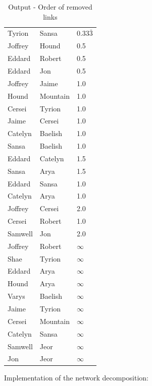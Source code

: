 \documentclass[10pt,a4paper]{article}
\begin{document}
\begin{enumerate}
	\begin{table}[H]
		\centering
		\caption{Output - Order of removed links}
		\label{table_links}
		\begin{tabular}{lll}
			Tyrion  & Sansa    & 0.33$\bar{3}$  \\
			Joffrey & Hound    & 0.5    \\
			Eddard  & Robert   & 0.5                 \\
			Eddard  & Jon      & 0.5                 \\
			Joffrey & Jaime    & 1.0                 \\
			Hound   & Mountain & 1.0                 \\
			Cersei  & Tyrion   & 1.0                 \\
			Jaime   & Cersei   & 1.0                 \\
			Catelyn & Baelish  & 1.0                 \\
			Sansa   & Baelish  & 1.0                 \\
			Eddard  & Catelyn  & 1.5                 \\
			Sansa   & Arya     & 1.5                 \\
			Eddard  & Sansa    & 1.0                 \\
			Catelyn & Arya     & 1.0                 \\
			Joffrey & Cersei   & 2.0                 \\
			Cersei  & Robert   & 1.0                 \\
			Samwell & Jon      & 2.0                 \\
			Joffrey & Robert   & $\infty$ \\
			Shae    & Tyrion   & $\infty$ \\
			Eddard  & Arya     & $\infty$ \\
			Hound   & Arya     & $\infty$ \\
			Varys   & Baelish  & $\infty$ \\
			Jaime   & Tyrion   & $\infty$ \\
			Cersei  & Mountain & $\infty$ \\
			Catelyn & Sansa    & $\infty$ \\
			Samwell & Jeor     & $\infty$ \\
			Jon     & Jeor     & $\infty$
		\end{tabular}
	\end{table}
	
	Implementation of the network decomposition:  
	

\end{enumerate}
\end{document}
